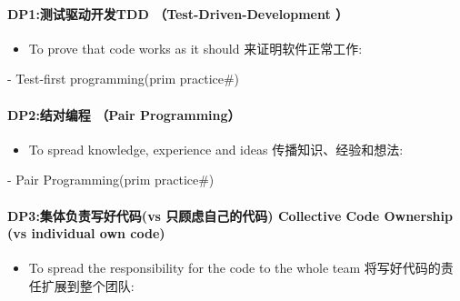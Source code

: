 \hypertarget{dp1ux6d4bux8bd5ux9a71ux52a8ux5f00ux53d1tdd-test-driven-development}{%
\paragraph{DP1:测试驱动开发TDD （Test-Driven-Development
）}\label{dp1ux6d4bux8bd5ux9a71ux52a8ux5f00ux53d1tdd-test-driven-development}}

\begin{itemize}
\tightlist
\item
  To prove that code works as it should 来证明软件正常工作:\\
\end{itemize}

\begin{description}
\tightlist
\item[]
- Test-first programming(prim practice\#)
\end{description}

\hypertarget{dp2ux7ed3ux5bf9ux7f16ux7a0b-pair-programming}{%
\paragraph{DP2:结对编程 （Pair
Programming）}\label{dp2ux7ed3ux5bf9ux7f16ux7a0b-pair-programming}}

\begin{itemize}
\tightlist
\item
  To spread knowledge, experience and ideas 传播知识、经验和想法:\\
\end{itemize}

\begin{description}
\tightlist
\item[]
- Pair Programming(prim practice\#)
\end{description}

\hypertarget{dp3ux96c6ux4f53ux8d1fux8d23ux5199ux597dux4ee3ux7801vs-ux53eaux987eux8651ux81eaux5df1ux7684ux4ee3ux7801-collective-code-ownership-vs-individual-own-code}{%
\paragraph{DP3:集体负责写好代码(vs 只顾虑自己的代码) Collective Code
Ownership (vs individual own
code)}\label{dp3ux96c6ux4f53ux8d1fux8d23ux5199ux597dux4ee3ux7801vs-ux53eaux987eux8651ux81eaux5df1ux7684ux4ee3ux7801-collective-code-ownership-vs-individual-own-code}}

\begin{itemize}
\tightlist
\item
  To spread the responsibility for the code to the whole team
  将写好代码的责任扩展到整个团队:\\
\end{itemize}

